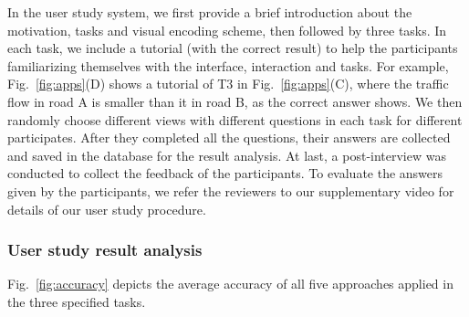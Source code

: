 In the user study system, we first provide a brief introduction about the motivation, tasks and visual encoding scheme, then followed by three tasks.
In each task, we include a tutorial (with the correct result) to help the participants familiarizing themselves with the interface, interaction and tasks.
For example, Fig.~\ref{fig:apps}(D) shows a tutorial of T3 in Fig.~\ref{fig:apps}(C), where the traffic flow in road A is smaller than it in road B, as the correct answer shows.
We then randomly choose different views with different questions in each task for different participates.
After they completed all the questions, their answers are collected and saved in the database for the result analysis.
At last, a post-interview was conducted to collect the feedback of the participants.
To evaluate the answers given by the participants, we refer the reviewers to our supplementary video for details of our user study procedure.


\subsubsection{User study result analysis}\label{sec:uret}
Fig.~\ref{fig:accuracy} depicts the average accuracy of all five approaches applied in the three specified tasks.



